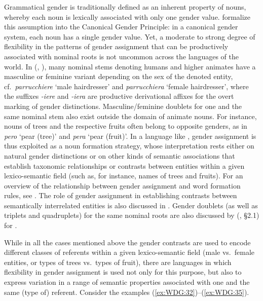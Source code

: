 \documentclass[output=collectionpaper]{langsci/langscibook}
\begin{document}
Grammatical gender is traditionally defined as an inherent property of nouns, whereby each noun is lexically associated with only one gender value. \cite[9]{Corbett2016} formalize this assumption into the Canonical Gender Principle: in a canonical gender system, each noun has a single gender value. Yet, a moderate to strong degree of flexibility in the patterns of gender assignment that can be productively associated with nominal roots is not uncommon across the languages of the world. In  (, ), many nominal stems denoting humans and higher animates have a masculine or feminine variant depending on the sex of the denoted entity, cf.\ \textit{parrucchiere} `male hairdresser' and \textit{parrucchiera} `female hairdresser', where the suffixes \textit{-iere} and \textit{-iera} are productive derivational affixes for the overt marking of gender distinctions.
%
Masculine/feminine doublets for one and the same nominal stem also exist outside the domain of animate nouns. For instance, nouns of trees and the respective fruits often belong to opposite genders, as in \textit{pero} `pear (tree)' and \textit{pera} `pear (fruit)'. In a language like , gender assignment is thus exploited as a noun formation strategy, whose interpretation rests either on natural gender distinctions or on other kinds of semantic associations that establish taxonomic relationships or contrasts between entities within a given lexico-semantic field (such as, for instance, names of trees and fruits). For an overview of the relationship between gender assignment and word formation rules, see \cite{Contini-Morava2013}. The role of gender assignment in establishing contrasts between semantically interrelated entities is also discussed in . Gender doublets (as well as triplets and quadruplets) for the same nominal roots are also discussed by  (, \S 2.1) for .

While in all the cases mentioned above the gender contrasts are used to encode different classes of referents within a given lexico-semantic field (male vs.\ female entities, or types of trees vs.\ types of fruit), there are languages in which flexibility in gender assignment is used not only for this purpose, but also to express variation in a range of semantic properties associated with one and the same (type of) referent. Consider the examples (\ref{ex:WDG:32})--(\ref{ex:WDG:35}).
\end{document}
